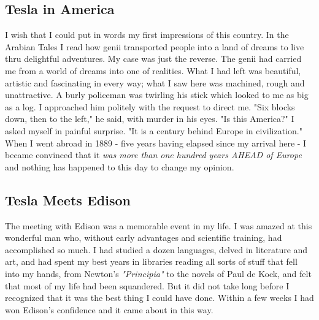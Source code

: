 \documentclass[a4paper,12pt,english,twoside,openright]{memoir}
\begin{document}
\subsection{Tesla in America}
I wish that I could put in words my first impressions of this country.  In the Arabian Tales I read 
how genii transported people into a land of dreams to live thru delightful adventures.  My case 
was just the reverse.  The genii had carried me from a world of dreams into one of realities.  What 
I had left was beautiful, artistic and fascinating in every way; what I saw here was machined, 
rough and unattractive.  A burly policeman was twirling his stick which looked to me as big as a 
log.  I approached him politely with the request to direct me.  "Six blocks down, then to the left," 
he said, with murder in his eyes.  "Is this America?" I asked myself in painful surprise.  "It is a 
century behind Europe in civilization." When I went abroad in 1889 - five years having elapsed 
since my arrival here - I became convinced that it \emph{was more than one hundred years AHEAD of 
Europe} and nothing has happened to this day to change my opinion.  

\vspace{-1em}
\subsection{Tesla Meets Edison}
The meeting with Edison was a memorable event in my life.  I was amazed at this wonderful man 
who, without early advantages and scientific training, had accomplished so much.  I had studied a 
dozen languages, delved in literature and art, and had spent my best years in libraries reading all 
sorts of stuff that fell into my hands, from Newton's \emph{"Principia"} to the novels of Paul de Kock, and 
felt that most of my life had been squandered.  But it did not take long before I recognized that it 
was the best thing I could have done.  Within a few weeks I had won Edison's confidence and it 
came about in this way.  
\end{document}
